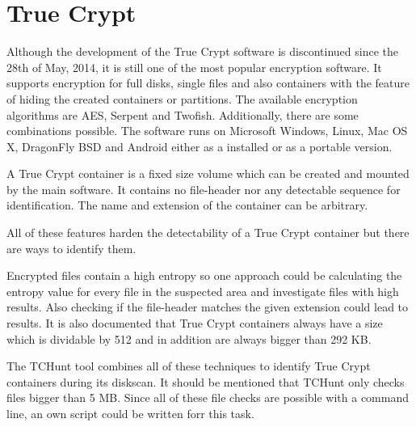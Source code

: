 \section{True Crypt}
Although the development of the True Crypt software is discontinued since the 28th of May, 2014, it is still one of the most popular encryption software.
It supports encryption for full disks, single files and also containers with the feature of hiding the created containers or partitions.
The available encryption algorithms are AES, Serpent and Twofish. Additionally, there are some combinations possible.
The software runs on Microsoft Windows, Linux, Mac OS X, DragonFly BSD and Android either as a installed or as a portable version.\cite{wiki:truecrypt}

A True Crypt container is a fixed size volume which can be created and mounted by the main software.
It contains no file-header nor any detectable sequence for identification.
The name and extension of the container can be arbitrary.

All of these features harden the detectability of a True Crypt container but there are ways to identify them.

Encrypted files contain a high entropy so one approach could be calculating the entropy value for every file in the suspected area and investigate files with high results.
Also checking if the file-header matches the given extension could lead to results.
It is also documented \cite{truecrypt_containerSize} that True Crypt containers always have a size which is dividable by 512 and in addition are always bigger than 292 KB.

The TCHunt tool combines all of these techniques to identify True Crypt containers during its diskscan. It should be mentioned that TCHunt only checks files bigger than 5 MB.
Since all of these file checks are possible with a command line, an own script could be written forr this task.

